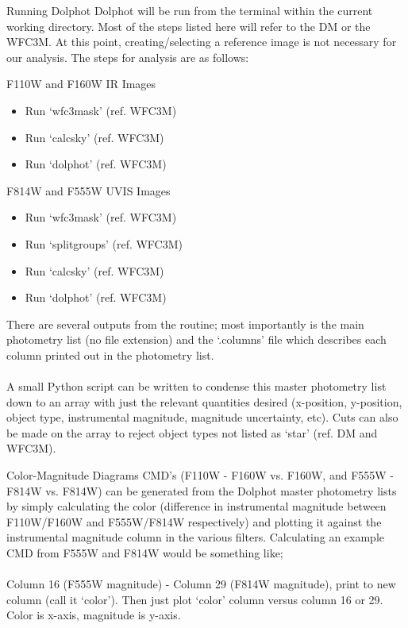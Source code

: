 \documentclass[12pt]{article}
\begin{document}
\begin{section}{Running Dolphot}
Dolphot will be run from the terminal within the current working directory. Most of the steps listed here will refer to the DM or the WFC3M. At this point, creating/selecting a reference image is not necessary for our analysis. The steps for analysis are as follows: \\
\begin{subsection}{F110W and F160W IR Images}
\begin{itemize}
\item Run `wfc3mask' (ref. WFC3M)
\item Run `calcsky' (ref. WFC3M)
\item Run `dolphot' (ref. WFC3M)
\end{itemize}
\end{subsection}

\begin{subsection}{F814W and F555W UVIS Images}
\begin{itemize}
\item Run `wfc3mask' (ref. WFC3M)
\item Run `splitgroups' (ref. WFC3M)
\item Run `calcsky' (ref. WFC3M)
\item Run `dolphot' (ref. WFC3M)
\end{itemize}
\end{subsection}
There are several outputs from the routine; most importantly is the main photometry list (no file extension) and the `.columns' file which describes each column printed out in the photometry list. \\
\\
A small Python script can be written to condense this master photometry list down to an array with just the relevant quantities desired (x-position, y-position, object type, instrumental magnitude, magnitude uncertainty, etc). Cuts can also be made on the array to reject object types not listed as `star' (ref. DM and WFC3M).

\end{section}

\begin{section}{Color-Magnitude Diagrams}
CMD's (F110W - F160W vs. F160W, and F555W - F814W vs. F814W) can be generated from the Dolphot master photometry lists by simply calculating the color (difference in instrumental magnitude between F110W/F160W and F555W/F814W respectively) and plotting it against the instrumental magnitude column in the various filters. Calculating an example CMD from F555W and F814W would be something like; \\
\\
Column 16 (F555W magnitude) - Column 29 (F814W magnitude), print to new column (call it `color'). Then just plot `color' column versus column 16 or 29. Color is x-axis, magnitude is y-axis.

\end{section}




 
\end{document}
